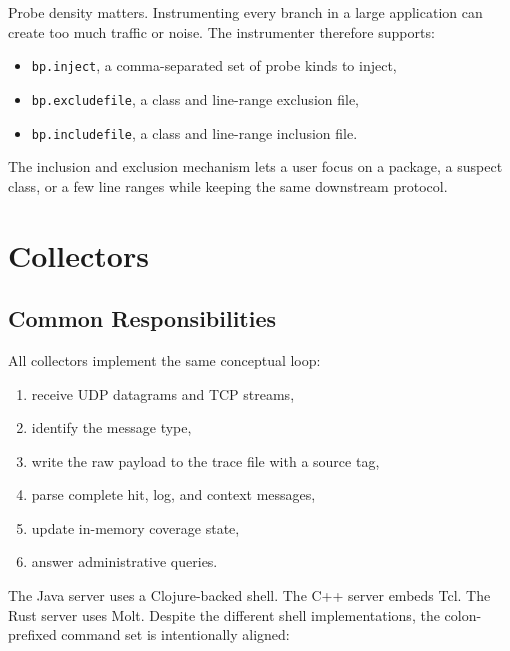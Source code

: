 \documentclass[11pt]{article}
\newcommand{\code}[1]{\texttt{#1}}
\begin{document}
Probe density matters. Instrumenting every branch in a large application can
create too much traffic or noise. The instrumenter therefore supports:

\begin{itemize}
  \item \code{bp.inject}, a comma-separated set of probe kinds to inject,
  \item \code{bp.excludefile}, a class and line-range exclusion file,
  \item \code{bp.includefile}, a class and line-range inclusion file.
\end{itemize}

The inclusion and exclusion mechanism lets a user focus on a package, a
suspect class, or a few line ranges while keeping the same downstream protocol.

\section{Collectors}

\subsection{Common Responsibilities}

All collectors implement the same conceptual loop:

\begin{enumerate}
  \item receive UDP datagrams and TCP streams,
  \item identify the message type,
  \item write the raw payload to the trace file with a source tag,
  \item parse complete hit, log, and context messages,
  \item update in-memory coverage state,
  \item answer administrative queries.
\end{enumerate}

The Java server uses a Clojure-backed shell. The C++ server embeds Tcl. The
Rust server uses Molt. Despite the different shell implementations, the
colon-prefixed command set is intentionally aligned:
\end{document}
